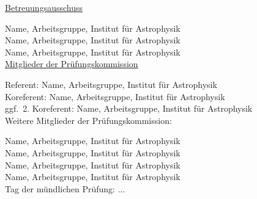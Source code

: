 \newpage

	\sffamily
	\noindent \underline{Betreuungsausschuss}
	\vspace{5mm}

	\noindent Name, Arbeitsgruppe, Institut für Astrophysik
	\vspace{5mm}\\
	Name, Arbeitsgruppe, Institut für Astrophysik
	\vspace{5mm}\\
	Name, Arbeitsgruppe, Institut für Astrophysik
	\vspace{10mm}\\

	\noindent \underline{Mitglieder der Prüfungskommission}
	\vspace{5mm}

	\noindent Referent: Name, Arbeitsgruppe, Institut für Astrophysik
	\vspace{5mm}\\
	Koreferent: Name, Arbeitsgruppe, Institut für Astrophysik
	\vspace{5mm}\\
	ggf.\ 2. Koreferent: Name, Arbeitsgruppe, Institut für Astrophysik
	\vspace{10mm}\\
	
	\noindent Weitere Mitglieder der Prüfungskommission:
	\vspace{5mm}
	
	\noindent Name, Arbeitsgruppe, Institut für Astrophysik
	\vspace{5mm}\\
	Name, Arbeitsgruppe, Institut für Astrophysik
	\vspace{5mm}\\
	Name, Arbeitsgruppe, Institut für Astrophysik
	\vspace{5mm}\\
	Name, Arbeitsgruppe, Institut für Astrophysik
	\vspace{15mm}\\
	
	\noindent Tag der mündlichen Prüfung: ...\\
	

	\rmfamily

\cleardoublepage

\tableofcontents

